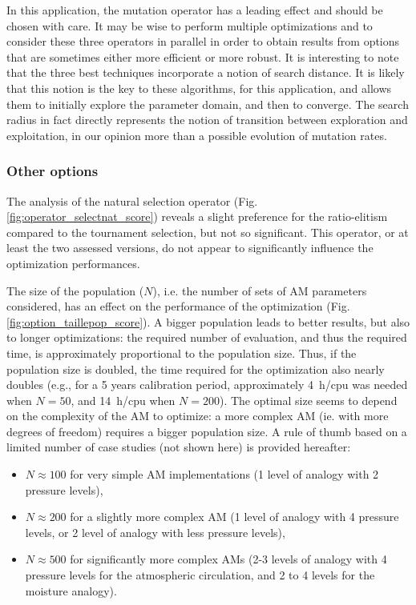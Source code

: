 \documentclass{ametsoc}
\begin{document}
In this application, the mutation operator has a leading effect and should be chosen with care. It may be wise to perform multiple optimizations and to consider these three operators in parallel in order to obtain results from options that are sometimes either more efficient or more robust. It is interesting to note that the three best techniques incorporate a notion of search distance. It is likely that this notion is the key to these algorithms, for this application, and allows them to initially explore the parameter domain, and then to converge. The search radius in fact directly represents the notion of transition between exploration and exploitation, in our opinion more than a possible evolution of mutation rates.


\subsubsection{Other options}

The analysis of the natural selection operator (Fig. \ref{fig:operator_selectnat_score}) reveals a slight preference for the ratio-elitism compared to the tournament selection, but not so significant. This operator, or at least the two assessed versions, do not appear to significantly influence the optimization performances.

The size of the population ($N$), i.e. the number of sets of AM parameters considered, has an effect on the performance of the optimization (Fig. \ref{fig:option_taillepop_score}). A bigger population leads to better results, but also to longer optimizations: the required number of evaluation, and thus the required time, is approximately proportional to the population size. Thus, if the population size is doubled, the time required for the optimization also nearly doubles (e.g., for a 5 years calibration period, approximately 4~h/cpu was needed when $N = 50$, and 14~h/cpu when $N = 200$). The optimal size seems to depend on the complexity of the AM to optimize: a more complex AM (ie. with more degrees of freedom) requires a bigger population size. A rule of thumb based on a limited number of case studies (not shown here) is provided hereafter:

\begin{itemize}
	\item $N\approx100$ for very simple AM implementations (1 level of analogy with 2 pressure levels),
	\item $N\approx200$ for a slightly more complex AM (1 level of analogy with 4 pressure levels, or 2 level of analogy with less pressure levels),
	\item $N\approx500$ for significantly more complex AMs (2-3 levels of analogy with 4 pressure levels for the atmospheric circulation, and 2 to 4 levels for the moisture analogy).
\end{itemize}
\end{document}
